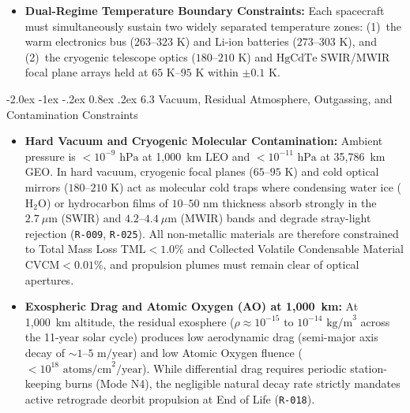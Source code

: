 \documentclass[11pt,a4paper]{article}
\makeatletter
\renewcommand\subsubsection{\@startsection{subsubsection}{3}{\z@}%
    {-2.0ex \@plus -1ex \@minus -.2ex}%
    {0.8ex \@plus .2ex}%
    {\normalfont\normalsize\bfseries\sffamily\color{SubHeadingBlue}}}
\providecommand{\abbr}[1]{#1}
\makeatother
\begin{document}
\begin{itemize}
\begin{enumerate}
    \end{enumerate}
    \item \textbf{Dual-Regime Temperature Boundary Constraints:} Each spacecraft must simultaneously sustain two widely separated temperature zones: (1)~the warm electronics bus ($263\text{--}323\text{ K}$) and $\mathrm{Li\text{-}ion}$ batteries ($273\text{--}303\text{ K}$), and (2)~the cryogenic telescope optics ($180\text{--}210\text{ K}$) and $\mathrm{HgCdTe}$ \abbr{SWIR}/\abbr{MWIR} focal plane arrays held at \textbf{$65\text{ K}\text{--}95\text{ K}$} within $\pm 0.1\text{ K}$.
\end{itemize}

\subsubsection{6.3 Vacuum, Residual Atmosphere, Outgassing, and Contamination Constraints}

\begin{itemize}
    \item \textbf{Hard Vacuum and Cryogenic Molecular Contamination:} Ambient pressure is $< 10^{-9}\text{ hPa}$ at 1,000~km \abbr{LEO} and $< 10^{-11}\text{ hPa}$ at 35,786~km \abbr{GEO}. In hard vacuum, cryogenic focal planes ($65\text{--}95\text{ K}$) and cold optical mirrors ($180\text{--}210\text{ K}$) act as molecular cold traps where condensing water ice ($\mathrm{H_2O}$) or hydrocarbon films of $10\text{--}50\text{ nm}$ thickness absorb strongly in the $2.7~\mu\mathrm{m}$ (\abbr{SWIR}) and $4.2\text{--}4.4~\mu\mathrm{m}$ (\abbr{MWIR}) bands and degrade stray-light rejection (\texttt{R-009}, \texttt{R-025}). All non-metallic materials are therefore constrained to Total Mass Loss $\mathrm{TML} < 1.0\%$ and Collected Volatile Condensable Material $\mathrm{CVCM} < 0.01\%$, and propulsion plumes must remain clear of optical apertures.
    \item \textbf{Exospheric Drag and Atomic Oxygen (\abbr{AO}) at 1,000~km:} At 1,000~km altitude, the residual exosphere ($\rho \approx 10^{-15}\text{ to }10^{-14}\text{ kg/m}^3$ across the 11-year solar cycle) produces low aerodynamic drag (semi-major axis decay of $\sim 1\text{--}5\text{ m/year}$) and low Atomic Oxygen fluence ($< 10^{18}\text{ atoms/cm}^2\text{/year}$). While differential drag requires periodic station-keeping burns (Mode N4), the negligible natural decay rate strictly mandates active retrograde deorbit propulsion at End of Life (\texttt{R-018}).
\end{itemize}
\end{document}

